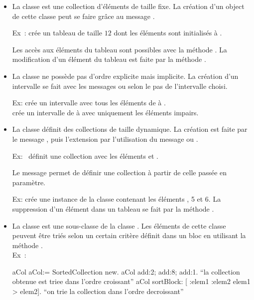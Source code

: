 \begin{itemize}
\item La classe  est une collection d'\'el\'ements de taille fixe. La cr\'eation d'un object de cette classe peut se faire gr\^ace au message .

Ex~:  cr\'ee un tableau de taille $12$ dont les \'el\'ements sont initialis\'es \`a .

Les acc\`es aux \'el\'ements du tableau sont possibles avec la m\'ethode . La modification d'un \'el\'ement du tableau est faite par la m\'ethode .

\item La classe  ne poss\`ede pas d'ordre explicite mais implicite. La cr\'eation d'un intervalle se fait avec les messages  ou  selon le pas de l'intervalle choisi.

Ex:  cr\'ee un intervalle avec tous les \'el\'ements de  \`a .\\
 cr\'ee un intervalle de  \`a  avec uniquement les \'el\'ements impairs.

\item La classe  d\'efinit des collections de taille dynamique.  La cr\'eation est faite par le message , puis l'extension par l'utilisation du message  ou .

Ex:~ d\'efinit une collection avec les \'el\'ements  et .

Le message  permet de d\'efinir une collection \`a partir de celle pass\'ee en param\`etre.

Ex:  cr\'ee une instance de la classe  contenant les \'el\'ements , 5 et 6.
La suppression d'un \'el\'ement dans un tableau se fait par la m\'ethode .

\item La classe  est une sous-classe de la classe . Les \'el\'ements de cette classe peuvent \^etre  tri\'es selon un certain crit\`ere d\'efinit dans un bloc en utilisant la m\'ethode .\\
Ex~: 
\begin{scode}
\stBar aCol \stBar
aCol:= SortedCollection new.
aCol add:2; add:8; add:1.     
         ``la collection obtenue est triee dans l'ordre croissant''
aCol sortBlock: [ :elem1 :elem2 \stBar elem1 > elem2]. 
         ``on trie la collection dans l'ordre decroissant''
\end{scode}
\end{itemize}


